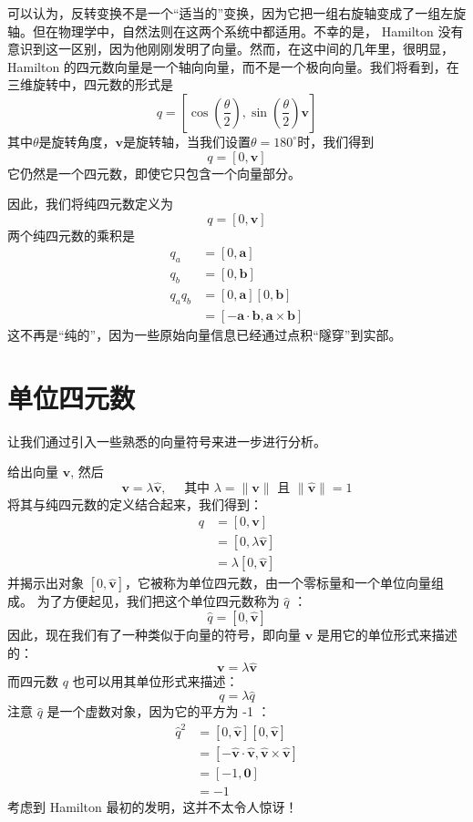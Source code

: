 可以认为，反转变换不是一个“适当的”变换，因为它把一组右旋轴变成了一组左旋轴。但在物理学中，自然法则在这两个系统中都适用。不幸的是， Hamilton 没有意识到这一区别，因为他刚刚发明了向量。然而，在这中间的几年里，很明显， Hamilton 的四元数向量是一个轴向向量，而不是一个极向向量。我们将看到，在三维旋转中，四元数的形式是
$$
    q=\left[\cos \left(\frac{\theta}{2}\right), \sin \left(\frac{\theta}{2}\right) \mathbf{v}\right]
$$
其中$\theta$是旋转角度，$\mathbf{v}$是旋转轴，当我们设置$\theta=180^{\circ}$时，我们得到
$$
    q=[0, \mathbf{v}]
$$
它仍然是一个四元数，即使它只包含一个向量部分。

因此，我们将纯四元数定义为
$$
    q=[0, \mathbf{v}]
$$
两个纯四元数的乘积是
$$
    \begin{aligned}
        q_{a}       & =[0, \mathbf{a}]                                              \\
        q_{b}       & =[0, \mathbf{b}]                                              \\
        q_{a} q_{b} & =[0, \mathbf{a}][0, \mathbf{b}]                               \\
                    & =[-\mathbf{a} \cdot \mathbf{b}, \mathbf{a} \times \mathbf{b}]
    \end{aligned}
$$
这不再是“纯的”，因为一些原始向量信息已经通过点积“隧穿”到实部。

\section{单位四元数}
让我们通过引入一些熟悉的向量符号来进一步进行分析。

给出向量 $\mathbf{v}$, 然后
$$
    \mathbf{v}=\lambda \hat{\mathbf{v}}, \quad \text { 其中 } \lambda=\|\mathbf{v}\| \text { 且 }\|\hat{\mathbf{v}}\|=1
$$
将其与纯四元数的定义结合起来，我们得到：
$$
    \begin{aligned}
        q & =[0, \mathbf{v}]               \\
          & =[0, \lambda \hat{\mathbf{v}}] \\
          & =\lambda[0, \hat{\mathbf{v}}]
    \end{aligned}
$$
并揭示出对象 $[0,\hat{\mathbf{v}}]$，它被称为单位四元数，由一个零标量和一个单位向量组成。 为了方便起见，我们把这个单位四元数称为 $\hat{q}$ ：
$$
    \hat{q}=[0, \hat{\mathbf{v}}]
$$
因此，现在我们有了一种类似于向量的符号，即向量 $\mathbf{v}$ 是用它的单位形式来描述的：
$$
    \mathbf{v}=\lambda \hat{\mathbf{v}}
$$
而四元数 $q$ 也可以用其单位形式来描述：
$$
    q=\lambda \hat{q}
$$
注意 $\hat{q}$ 是一个虚数对象，因为它的平方为 -1 ：
$$
    \begin{aligned}
        \hat{q}^{2} & =[0, \hat{\mathbf{v}}][0, \hat{\mathbf{v}}]                                           \\
                    & =[-\hat{\mathbf{v}} \cdot \hat{\mathbf{v}}, \hat{\mathbf{v}} \times \hat{\mathbf{v}}] \\
                    & =[-1, \mathbf{0}]                                                                     \\
                    & =-1
    \end{aligned}
$$
考虑到 Hamilton 最初的发明，这并不太令人惊讶！

